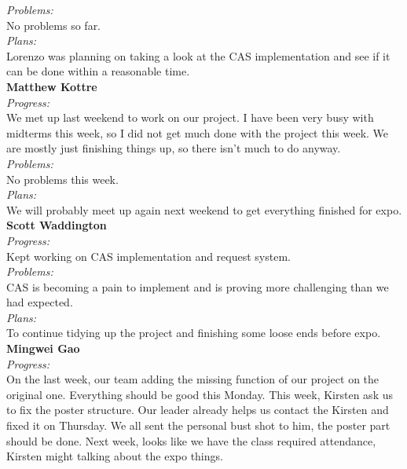 \noindent\textit{Problems:}\\
\noindent No problems so far.\\

\noindent\textit{Plans:}\\
\noindent Lorenzo was planning on taking a look at the CAS implementation and see if it can be done within a reasonable time.\\

\noindent\textbf{Matthew Kottre}\\
\noindent\textit{Progress:}\\
We met up last weekend to work on our project. I have been very busy with midterms this week, so I did not get much done with the project this week. We are mostly just finishing things up, so there isn't much to do anyway.\\

\noindent\textit{Problems:}\\
\noindent No problems this week.\\

\noindent\textit{Plans:}\\
\noindent We will probably meet up again next weekend to get everything finished for expo.\\

\noindent\textbf{Scott Waddington}\\
\noindent\textit{Progress:}\\
Kept working on CAS implementation and request system.\\

\noindent\textit{Problems:}\\
\noindent CAS is becoming a pain to implement and is proving more challenging than we had expected.\\

\noindent\textit{Plans:}\\
\noindent To continue tidying up the project and finishing some loose ends before expo.\\

\noindent\textbf{Mingwei Gao}\\
\noindent\textit{Progress:}\\
 On the last week, our team adding the missing function of our project on the original one. Everything should be good this Monday.  This week, Kirsten ask us to fix the poster structure. Our leader already helps us contact the Kirsten and fixed it on Thursday. We all sent the personal bust shot to him, the poster part should be done.  Next week, looks like we have the class required attendance, Kirsten might talking about the expo things. \\

